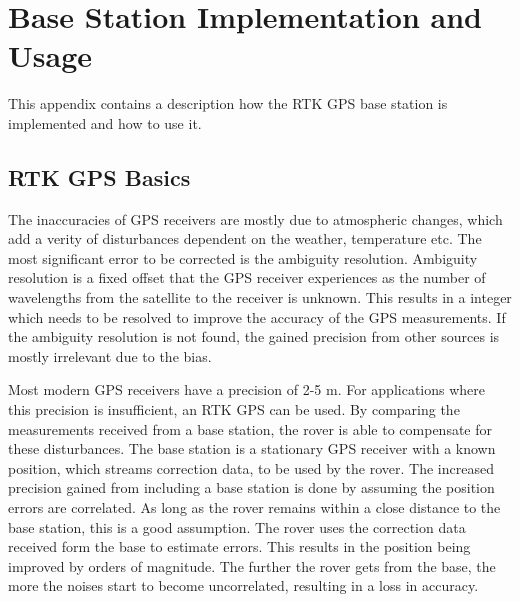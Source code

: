 \chapter{Base Station Implementation and Usage}\label{app:rtk_gps}
This appendix contains a description how the RTK GPS base station is implemented and how to use it.

\section*{RTK GPS Basics}
The inaccuracies of GPS receivers are mostly due to atmospheric changes, which add a verity of disturbances dependent on the weather, temperature etc.
The most significant error to be corrected is the ambiguity resolution. Ambiguity resolution is a fixed offset that the GPS receiver experiences as the number of wavelengths from the satellite to the receiver is unknown. This results in a integer which needs to be resolved to improve the accuracy of the GPS measurements. If the ambiguity resolution is not found, the gained precision from other sources is mostly irrelevant due to the bias. \cite{novatel} \cite{RTK_GPS} \cite{ambg_res}

Most modern GPS receivers have a precision of 2-5 m. For applications where this precision is insufficient, an RTK GPS can be used. By comparing the measurements received from a base station, the rover is able to compensate for these disturbances. The base station is a stationary GPS receiver with a known position, which streams correction data, to be used by the rover. The increased precision gained from including a base station is done by assuming the position errors are correlated. As long as the rover remains within a close distance to the base station, this is a good assumption. The rover uses the correction data received form the base to estimate errors. This results in the position being improved by orders of magnitude. 
The further the rover gets from the base, the more the noises start to become uncorrelated, resulting in a loss in accuracy. \cite{EmlidRTK} \cite{RTK_GPS}




